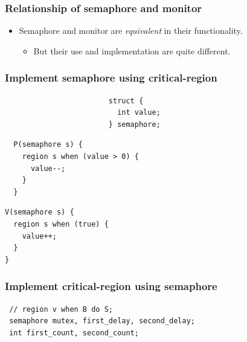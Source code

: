 \documentclass[CJKutf8,xcolor=pdftex,dvipsnames,table]{beamer}
\begin{document}
\begin{CJK*}{UTF8}{song}
\fi

  \begin{frame}
  \frametitle{Relationship of semaphore and monitor} \pause
  \begin{itemize}
  \item{Semaphore and monitor are \emph{equivalent} in their functionality.} \pause
    \begin{itemize}
    \item{But their use and implementation are quite different.} \pause
    \end{itemize}
  \end{itemize}
  \end{frame}

\iffalse

  \begin{frame}[fragile]
  \frametitle{Implement semaphore using critical-region} \pause

\begin{lstlisting}
                        struct {
                          int value;
                        } semaphore;
\end{lstlisting} \pause
  \begin{minipage}[c]{0.5\textwidth}

\begin{lstlisting}
  P(semaphore s) {
    region s when (value > 0) {
      value--;
    }
  }
\end{lstlisting}

  \pause

\end{minipage}%
\begin{minipage}[c]{0.5\textwidth}

\begin{lstlisting}
V(semaphore s) {
  region s when (true) {
    value++;
  }
}
\end{lstlisting}

    \end{minipage}

\end{frame}

  \begin{frame}[fragile]
  \frametitle{Implement critical-region using semaphore} \pause

\begin{lstlisting}
 // region v when B do S;
 semaphore mutex, first_delay, second_delay;
 int first_count, second_count;
\end{lstlisting}
  \pause
  \begin{minipage}[c]{0.4\textwidth}


\end{minipage}
\end{frame}
\end{CJK*}
\end{document}
